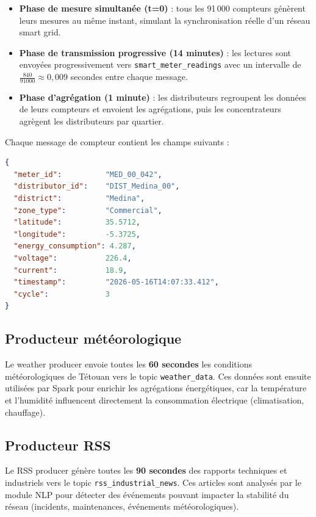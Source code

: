 \documentclass[1pt,a4paper]{report}
\begin{document}
\begin{itemize}
    \item \textbf{Phase de mesure simultanée (t=0)} : tous les 91\,000 compteurs génèrent
    leurs mesures au même instant, simulant la synchronisation réelle d'un réseau smart grid.
    \item \textbf{Phase de transmission progressive (14 minutes)} : les lectures sont envoyées
    progressivement vers \texttt{smart\_meter\_readings} avec un intervalle de
    $\frac{840}{91000} \approx 0{,}009$ secondes entre chaque message.
    \item \textbf{Phase d'agrégation (1 minute)} : les distributeurs regroupent les données de
    leurs compteurs et envoient les agrégations, puis les concentrateurs agrègent les
    distributeurs par quartier.
\end{itemize}

Chaque message de compteur contient les champs suivants :

\begin{lstlisting}[language=json, caption={Structure d'un message smart meter dans Kafka}]
{
  "meter_id":          "MED_00_042",
  "distributor_id":    "DIST_Medina_00",
  "district":          "Medina",
  "zone_type":         "Commercial",
  "latitude":          35.5712,
  "longitude":         -5.3725,
  "energy_consumption": 4.287,
  "voltage":           226.4,
  "current":           18.9,
  "timestamp":         "2026-05-16T14:07:33.412",
  "cycle":             3
}
\end{lstlisting}

\subsection{Producteur météorologique}

Le weather producer envoie toutes les \textbf{60 secondes} les conditions météorologiques
de Tétouan vers le topic \texttt{weather\_data}. Ces données sont ensuite utilisées
par Spark pour enrichir les agrégations énergétiques, car la température et l'humidité
influencent directement la consommation électrique (climatisation, chauffage).

\subsection{Producteur RSS}

Le RSS producer génère toutes les \textbf{90 secondes} des rapports techniques et
industriels vers le topic \texttt{rss\_industrial\_news}. Ces articles sont analysés
par le module NLP pour détecter des événements pouvant impacter la stabilité du réseau
(incidents, maintenances, événements météorologiques).
\end{document}
